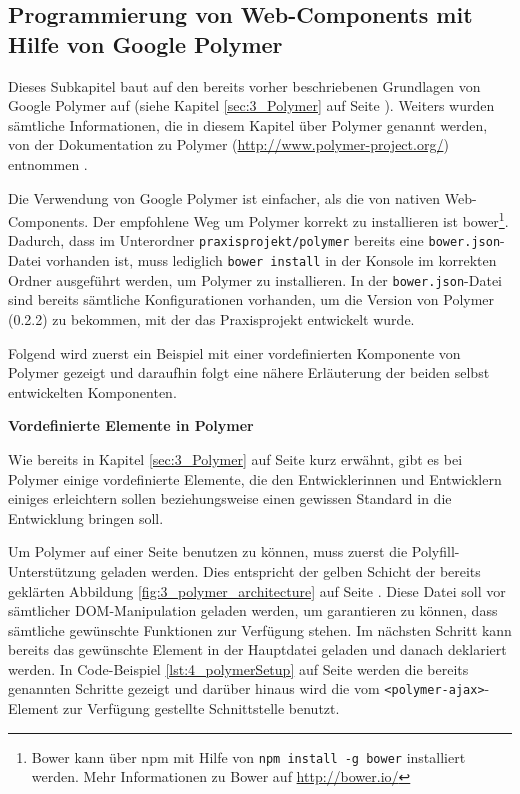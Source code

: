 \subsection{Programmierung von Web-Components mit Hilfe von Google Polymer}
\label{sec:4_WC_Polymer}

Dieses Subkapitel baut auf den bereits vorher beschriebenen Grundlagen von Google Polymer auf (siehe Kapitel \ref{sec:3_Polymer} auf Seite \pageref{sec:3_Polymer}). Weiters wurden sämtliche Informationen, die in diesem Kapitel über Polymer genannt werden, von der Dokumentation zu Polymer (\url{http://www.polymer-project.org/}) entnommen \citereset \autocite[siehe][]{Polymer}.

Die Verwendung von Google Polymer ist einfacher, als die von nativen Web-Components. Der empfohlene Weg um Polymer korrekt zu installieren ist \glqq bower\footnote{Bower kann über npm mit Hilfe von \lstinline|npm install -g bower| installiert werden. Mehr Informationen zu Bower auf \href{http://bower.io/}{http://bower.io/}}\grqq . Dadurch, dass im Unterordner \lstinline|praxisprojekt/polymer| bereits eine \lstinline|bower.json|-Datei vorhanden ist, muss lediglich \lstinline|bower install| in der Konsole im korrekten Ordner ausgeführt werden, um Polymer zu installieren. In der \lstinline|bower.json|-Datei sind bereits sämtliche Konfigurationen vorhanden, um die Version von Polymer (0.2.2) zu bekommen, mit der das Praxisprojekt entwickelt wurde.

Folgend wird zuerst ein Beispiel mit einer vordefinierten Komponente von Polymer gezeigt und daraufhin folgt eine nähere Erläuterung der beiden selbst entwickelten Komponenten.

\textbf{Vordefinierte Elemente in Polymer}

Wie bereits in Kapitel \ref{sec:3_Polymer} auf Seite \pageref{sec:3_Polymer} kurz erwähnt, gibt es bei Polymer einige vordefinierte Elemente, die den Entwicklerinnen und Entwicklern einiges erleichtern sollen beziehungsweise einen gewissen Standard in die Entwicklung bringen soll.

Um Polymer auf einer Seite benutzen zu können, muss zuerst die Polyfill-Unterstützung geladen werden. Dies entspricht der gelben Schicht der bereits geklärten Abbildung \ref{fig:3_polymer_architecture} auf Seite \pageref{fig:3_polymer_architecture}.
Diese Datei soll vor sämtlicher DOM-Manipulation geladen werden, um garantieren zu können, dass sämtliche gewünschte Funktionen zur Verfügung stehen. Im nächsten Schritt kann bereits das gewünschte Element in der Hauptdatei geladen und danach deklariert werden. In Code-Beispiel \ref{lst:4_polymerSetup} auf Seite \pageref{lst:4_polymerSetup} werden die bereits genannten Schritte gezeigt und darüber hinaus wird die vom \lstinline|<polymer-ajax>|-Element zur Verfügung gestellte Schnittstelle benutzt.

